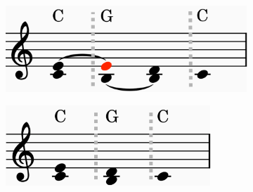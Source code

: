 \documentclass[12pt,a4paper,twoside,openright]{report}
\theoremstyle{definition}
\begin{document}
\begin{figure}
  \centering
  \begin{subfigure}[t]{.44\textwidth}
    \centering\includegraphics[keepaspectratio,width=\textwidth]{prep/harm/unreducedScore.png}
    \caption{}
    \label{fig:pvHarmonyUnreducedInner}
  \end{subfigure}
  \begin{subfigure}[t]{.44\textwidth}
    \centering\includegraphics[keepaspectratio,width=0.85\textwidth]{prep/harm/reducedScore.png}
    \caption{}
    \label{fig:pvHarmonyReducedInner}
  \end{subfigure}


\end{figure}
\end{document}
